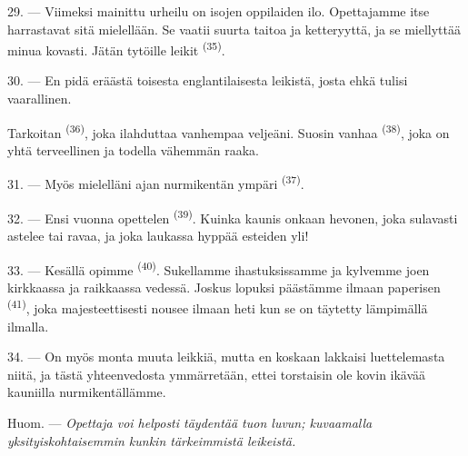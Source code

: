 29. --- Viimeksi mainittu urheilu on isojen oppilaiden ilo. Opettajamme itse
harrastavat sitä mielellään. Se vaatii suurta taitoa ja ketteryyttä, ja se
miellyttää minua kovasti. Jätän tytöille leikit 
\textsuperscript{(35)}.

30. --- En pidä eräästä toisesta englantilaisesta leikistä, josta ehkä tulisi
vaarallinen.

Tarkoitan  \textsuperscript{(36)}, joka ilahduttaa
vanhempaa veljeäni. Suosin vanhaa 
\textsuperscript{(38)}, joka on yhtä terveellinen ja todella vähemmän raaka.

\VUsaut{4.6mm}
\VUsaut{3.0mm}

31. --- Myös mielelläni ajan nurmikentän ympäri 
\textsuperscript{(37)}.

32. --- Ensi vuonna opettelen  \textsuperscript{(39)}.
Kuinka kaunis onkaan hevonen, joka sulavasti astelee tai ravaa, ja joka
laukassa hyppää esteiden yli!

33. --- Kesällä opimme  \textsuperscript{(40)}. Sukellamme
ihastuksissamme ja kylvemme joen kirkkaassa ja raikkaassa vedessä. Joskus
lopuksi päästämme ilmaan paperisen  \textsuperscript{(41)},
joka majesteettisesti nousee ilmaan heti kun se on täytetty lämpimällä ilmalla.

34. --- On myös monta muuta leikkiä, mutta en koskaan lakkaisi luettelemasta
niitä, ja tästä yhteenvedosta ymmärretään, ettei torstaisin ole kovin ikävää
kauniilla nurmikentällämme.

Huom. --- \textit{Opettaja voi helposti täydentää tuon luvun; kuvaamalla
yksityiskohtaisemmin kunkin tärkeimmistä leikeistä.}
\VUsaut{6.0mm}
\VUfilet{22mm}
